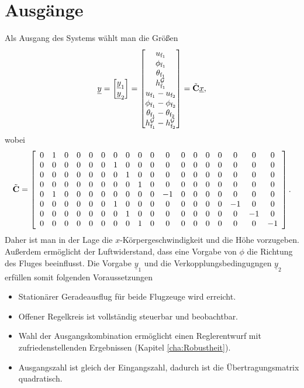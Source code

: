 \section{Ausgänge}
Als Ausgang des Systems wählt man die Grö{\ss}en
\begin{equation}
\underline{y} = \begin{bmatrix} \underline{y}_\mathrm{1}\\\underline{y}_\mathrm{2}  \end{bmatrix} = \begin{bmatrix} u_\mathrm{f_1}\\\phi_\mathrm{f_1}\\ \theta_\mathrm{f_1}\\ h^\mathcal{G}_\mathrm{f_1}\\u_\mathrm{f_1}-u_\mathrm{f_2}\\ \phi_\mathrm{f_1} -\phi_\mathrm{f_2}\\\theta_\mathrm{f_1}-\theta_\mathrm{f_2}\\ h^\mathcal{G}_\mathrm{f_1} - h^\mathcal{G}_\mathrm{f_2} \end{bmatrix} = \Tilde{\textbf{C}}\underline{x},
\end{equation}
wobei
\begin{equation}
 \Tilde{\textbf{C}} =  \left[\begin{array}{cccccccccccccccccc} 0 & 1 & 0 & 0 & 0 & 0 & 0 & 0 & 0 & 0 & 0 & 0 & 0 & 0 & 0 & 0 & 0 & 0\\ 0 & 0 & 0 & 0 & 0 & 0 & 1 & 0 & 0 & 0 & 0 & 0 & 0 & 0 & 0 & 0 & 0 & 0\\ 0 & 0 & 0 & 0 & 0 & 0 & 0 & 1 & 0 & 0 & 0 & 0 & 0 & 0 & 0 & 0 & 0 & 0\\ 0 & 0 & 0 & 0 & 0 & 0 & 0 & 0 & 1 & 0 & 0 & 0 & 0 & 0 & 0 & 0 & 0 & 0\\ 0 & 1 & 0 & 0 & 0 & 0 & 0 & 0 & 0 & 0 & -1 & 0 & 0 & 0 & 0 & 0 & 0 & 0\\ 0 & 0 & 0 & 0 & 0 & 0 & 1 & 0 & 0 & 0 & 0 & 0 & 0 & 0 & 0 & -1 & 0 & 0\\ 0 & 0 & 0 & 0 & 0 & 0 & 0 & 1 & 0 & 0 & 0 & 0 & 0 & 0 & 0 & 0 & -1 & 0\\ 0 & 0 & 0 & 0 & 0 & 0 & 0 & 0 & 1 & 0 & 0 & 0 & 0 & 0 & 0 & 0 & 0 & -1 \end{array}\right].
\end{equation}
\newline
Daher ist man in der Lage die $x$-Körpergeschwindigkeit und die Höhe vorzugeben. Außerdem ermöglicht der Luftwiderstand, dass eine Vorgabe von $\phi$ die Richtung des Fluges beeinflusst.  Die Vorgabe $\underline{y}_\mathrm{1}$ und die Verkopplungsbedingugngen $\underline{y}_\mathrm{2}$ erfüllen somit folgenden Voraussetzungen
\begin{itemize}
\item Stationärer Geradeausflug für beide Flugzeuge wird erreicht.
\item Offener Regelkreis ist vollständig steuerbar und beobachtbar.
\item Wahl der Ausgangskombination ermöglicht einen Reglerentwurf mit zufriedenstellenden Ergebnissen (Kapitel \ref{cha:Robustheit}).
\item Ausgangszahl ist gleich der Eingangszahl, dadurch ist die Übertragungsmatrix quadratisch.
\end{itemize}

